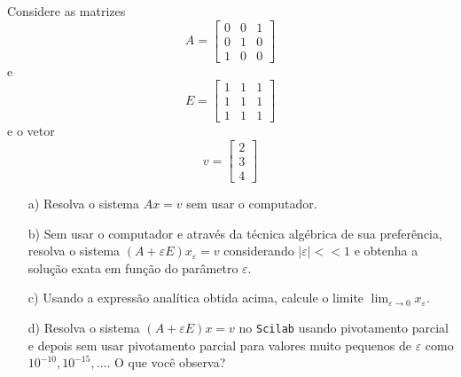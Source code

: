 \ifisscilab
\begin{exer} Considere as matrizes
  \begin{equation*}
    A=
    \begin{bmatrix}
      0&0&1\\
      0&1&0\\
      1&0&0      
    \end{bmatrix}
  \end{equation*}
e
\begin{equation*}
  E=
  \begin{bmatrix}
    1&1&1\\
    1&1&1\\
    1&1&1    
  \end{bmatrix}
\end{equation*}
e o vetor
\begin{equation*}
  v=
  \begin{bmatrix}
    2\\
    3\\
    4    
  \end{bmatrix}
\end{equation*}
\begin{itemize}
\item[a)] Resolva o sistema $Ax=v$ sem usar o computador.
\item[b)] Sem usar o computador e através da técnica algébrica de sua preferência, resolva o sistema $(A+\varepsilon E)x_\varepsilon=v$ considerando $|\varepsilon|<<1$ e obtenha a solução exata em função do parâmetro $\varepsilon$.
\item[c)] Usando a expressão analítica obtida acima, calcule o limite $\lim_{\varepsilon\to 0} x_\varepsilon $.
\item[d)] Resolva o sistema $(A+\varepsilon E)x=v$ no \verb+Scilab+ usando pivotamento parcial e depois sem usar pivotamento parcial para valores muito pequenos de $\varepsilon$ como $10^{-10}, 10^{-15}, \ldots$. O que você observa?
\end{itemize}
\end{exer}

